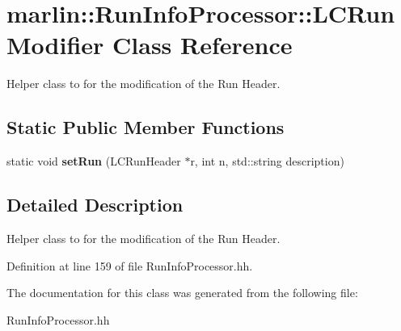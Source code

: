 \section{marlin::RunInfoProcessor::LCRunModifier Class Reference}
\label{classmarlin_1_1RunInfoProcessor_1_1LCRunModifier}


Helper class to for the modification of the Run Header.  
\subsection*{Static Public Member Functions}
\begin{DoxyCompactItemize}
\item 
static void {\bfseries setRun} (LCRunHeader $\ast$r, int n, std::string description)\label{classmarlin_1_1RunInfoProcessor_1_1LCRunModifier_ad5b4d3ac8439c98e21d6ec66de4ec8ab}

\end{DoxyCompactItemize}


\subsection{Detailed Description}
Helper class to for the modification of the Run Header. 

Definition at line 159 of file RunInfoProcessor.hh.

The documentation for this class was generated from the following file:\begin{DoxyCompactItemize}
\item 
RunInfoProcessor.hh\end{DoxyCompactItemize}
